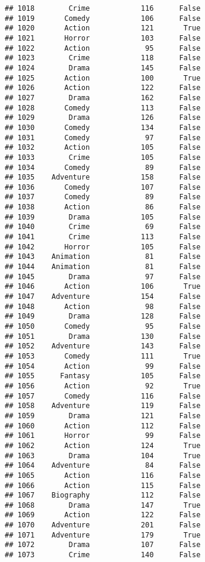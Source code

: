 \documentclass[
]{article}
\begin{document}
\begin{verbatim}
## 1018        Crime            116      False
## 1019       Comedy            106      False
## 1020       Action            121       True
## 1021       Horror            103      False
## 1022       Action             95      False
## 1023        Crime            118      False
## 1024        Drama            145      False
## 1025       Action            100       True
## 1026       Action            122      False
## 1027        Drama            162      False
## 1028       Comedy            113      False
## 1029        Drama            126      False
## 1030       Comedy            134      False
## 1031       Comedy             97      False
## 1032       Action            105      False
## 1033        Crime            105      False
## 1034       Comedy             89      False
## 1035    Adventure            158      False
## 1036       Comedy            107      False
## 1037       Comedy             89      False
## 1038       Action             86      False
## 1039        Drama            105      False
## 1040        Crime             69      False
## 1041        Crime            113      False
## 1042       Horror            105      False
## 1043    Animation             81      False
## 1044    Animation             81      False
## 1045        Drama             97      False
## 1046       Action            106       True
## 1047    Adventure            154      False
## 1048       Action             98      False
## 1049        Drama            128      False
## 1050       Comedy             95      False
## 1051        Drama            130      False
## 1052    Adventure            143      False
## 1053       Comedy            111       True
## 1054       Action             99      False
## 1055      Fantasy            105      False
## 1056       Action             92       True
## 1057       Comedy            116      False
## 1058    Adventure            119      False
## 1059        Drama            121      False
## 1060       Action            112      False
## 1061       Horror             99      False
## 1062       Action            124       True
## 1063        Drama            104       True
## 1064    Adventure             84      False
## 1065       Action            116      False
## 1066       Action            115      False
## 1067    Biography            112      False
## 1068        Drama            147       True
## 1069       Action            122      False
## 1070    Adventure            201      False
## 1071    Adventure            179       True
## 1072        Drama            107      False
## 1073        Crime            140      False

\end{verbatim}
\end{document}
